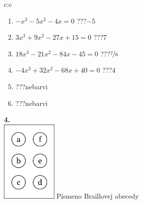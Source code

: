 \documentclass[10pt]{report}
\begin{document}
\begin{tabular}{c:c}
\begin{minipage}[c][104.5mm][t]{0.5\linewidth}
\begin{center}
\begin{minipage}{0.79\linewidth}
\begin{center}
\begin{varwidth}{\linewidth}
\begin{enumerate}
\Large
\item $-x^3-5x^2-4x=0$\quad \dotfill\; ???\;\dotfill \quad $-5$
\item $3x^3+9x^2-27x+15=0$\quad \dotfill\; ???\;\dotfill \quad $7$
\item $18x^3-21x^2-84x-45=0$\quad \dotfill\; ???\;\dotfill \quad $\nicefrac{7}{6}$
\item $-4x^3+32x^2-68x+40=0$\quad \dotfill\; ???\;\dotfill \quad $4$
\item \quad \dotfill\; ???\;\dotfill \quad nebarvi
\item \quad \dotfill\; ???\;\dotfill \quad nebarvi
\end{enumerate}
\end{varwidth}
\end{center}
\end{minipage}
\begin{minipage}{0.20\linewidth}
\begin{center}
{\Huge\bfseries 4.} \\[2mm]
\includegraphics[height=40mm]{../images/braille.png}
{\small Písmeno Braillovej abecedy}
\end{center}
\end{minipage}
\end{center}
\end{minipage}
%
\end{tabular}
\newpage
\thispagestyle{empty}
\end{document}
